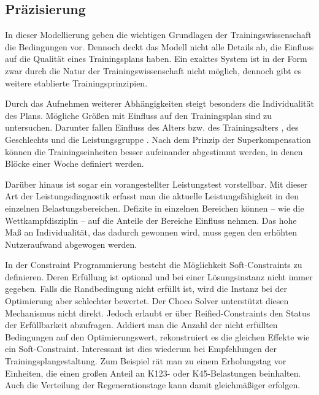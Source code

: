 \subsection{Präzisierung}
In dieser Modellierung geben die wichtigen Grundlagen der Trainingswissenschaft die Bedingungen vor. Dennoch deckt das Modell nicht alle Details ab, die Einfluss auf die Qualität eines Trainingsplans haben. Ein exaktes System ist in der Form zwar durch die Natur der Trainingswissenschaft nicht möglich, dennoch gibt es weitere etablierte Trainingsprinzipien. \par
Durch das Aufnehmen weiterer Abhängigkeiten steigt besonders die Individualität des Plans. Mögliche Größen mit Einfluss auf den Trainingsplan sind zu untersuchen. Darunter fallen Einfluss des Alters bzw. des Trainingsalters \cite[181]{EinfuerungTrainingswissenschaft}, des Geschlechts und die Leistungsgruppe \cite[S. 173]{Radsporttraining}. Nach dem Prinzip der Superkompensation können die Trainingseinheiten besser aufeinander abgestimmt werden, in denen Blöcke einer Woche definiert werden.\par
Darüber hinaus ist sogar ein vorangestellter Leistungstest vorstellbar. Mit dieser Art der Leistungsdiagnostik erfasst man die aktuelle Leistungsfähigkeit in den einzelnen Belastungsbereichen. Defizite in einzelnen Bereichen können --  wie die Wettkampfdisziplin -- auf die Anteile der Bereiche Einfluss nehmen. Das hohe Maß an Individualität, das dadurch gewonnen wird, muss gegen den erhöhten Nutzeraufwand abgewogen werden. \par
In der Constraint Programmierung besteht die Möglichkeit Soft-Constraints zu definieren. Deren Erfüllung ist optional und bei einer Lösungsinstanz nicht immer gegeben. Falls die Randbedingung nicht erfüllt ist, wird die Instanz bei der Optimierung aber schlechter bewertet. Der Choco Solver unterstützt diesen Mechanismus nicht direkt. Jedoch erlaubt er über Reified-Constraints den Status der Erfüllbarkeit abzufragen. Addiert man die Anzahl der nicht erfüllten Bedingungen auf den Optimierungswert, rekonstruiert es die gleichen Effekte wie ein Soft-Constraint. Interessant ist dies wiederum bei Empfehlungen der Trainingsplangestaltung. Zum Beispiel rät man zu einem Erholungstag vor Einheiten, die einen großen Anteil an K123- oder K45-Belastungen beinhalten. Auch die Verteilung der Regenerationstage kann damit gleichmäßiger erfolgen. 

